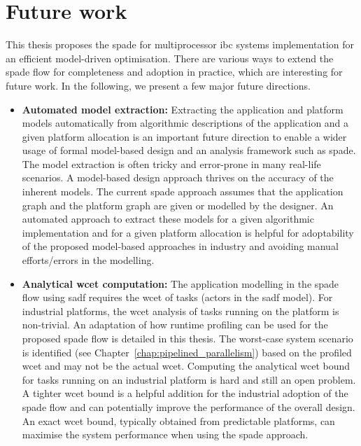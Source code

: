 \section{Future work}
This thesis proposes the \acrlong{spade} for multiprocessor \gls{ibc} systems implementation for an efficient model-driven optimisation.
There are various ways to extend the \gls{spade} flow for completeness and adoption in practice, which are interesting for future work. In the following, we present a few major future directions.

\begin{itemize}
    \item \textbf{Automated model extraction:} Extracting the application and platform models automatically from algorithmic descriptions of the application and a given platform allocation is an important future direction to enable a wider usage of formal model-based design and an analysis framework such as \gls{spade}. The model extraction is often tricky and error-prone in many real-life scenarios. A model-based design approach thrives on the accuracy of the inherent models. The current \gls{spade} approach assumes that the application graph and the platform graph are given or modelled by the designer. An automated approach to extract these models for a given algorithmic implementation and for a given platform allocation is helpful for adoptability of the proposed model-based approaches in industry  and avoiding manual efforts/errors in the modelling.
    \item \textbf{Analytical \gls{wcet} computation:} The application modelling in the \gls{spade} flow using \gls{sadf} requires the \gls{wcet} of tasks (actors in the \gls{sadf} model). For industrial platforms, the \gls{wcet} analysis of tasks running on the platform is non-trivial. An adaptation of how runtime profiling can be used for the proposed \gls{spade} flow is detailed in this thesis. The worst-case system scenario is identified (see Chapter~\ref{chap:pipelined_parallelism}) based on the profiled \gls{wcet} and may not be the actual \gls{wcet}. Computing the analytical \gls{wcet} bound for tasks running on an industrial platform is hard and still an open problem. A tighter \gls{wcet} bound is a helpful addition for the industrial adoption of the \gls{spade} flow and can potentially improve the performance of the overall design. An exact \gls{wcet} bound, typically obtained from predictable platforms, can maximise the system performance when using the \gls{spade} approach.

\end{itemize}

